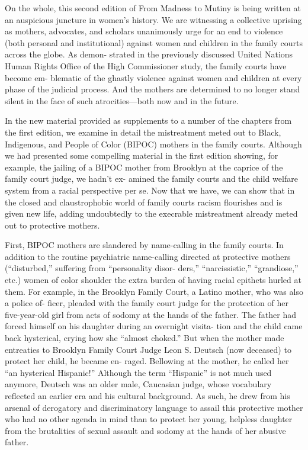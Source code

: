 On the whole, this second edition of From Madness to Mutiny is being
written at an auspicious juncture in women’s history. We are witnessing
a collective uprising as mothers, advocates, and scholars unanimously
urge for an end to violence (both personal and institutional) against
women and children in the family courts across the globe. As demon-
strated in the previously discussed United Nations Human Rights Office
of the High Commissioner study, the family courts have become em-
blematic of the ghastly violence against women and children at every
phase of the judicial process. And the mothers are determined to no
longer stand silent in the face of such atrocities—both now and in the
future. \pfl{}





In the new material provided as supplements to a number of the chapters
from the first edition, we examine in detail the mistreatment meted
out to Black, Indigenous, and People of Color (BIPOC) mothers in the
family courts. Although we had presented some compelling material in
the first edition showing, for example, the jailing of a BIPOC mother
from Brooklyn at the caprice of the family court judge, we hadn’t ex-
amined the family courts and the child welfare system from a racial
perspective per se. Now that we have, we can show that in the closed and
claustrophobic world of family courts racism flourishes and is given new
life, adding undoubtedly to the execrable mistreatment already meted
out to protective mothers. \pfl{}



First, BIPOC mothers are slandered by name-calling in the family
courts. In addition to the routine psychiatric name-calling directed
at protective mothers (“disturbed,” suffering from “personality disor-
ders,” “narcissistic,” “grandiose,” etc.) women of color shoulder the extra
burden of having racial epithets hurled at them. For example, in the
Brooklyn Family Court, a Latino mother, who was also a police of-
ficer, pleaded with the family court judge for the protection of her
five-year-old girl from acts of sodomy at the hands of the father. The
father had forced himself on his daughter during an overnight visita-
tion and the child came back hysterical, crying how she “almost choked.”
But when the mother made entreaties to Brooklyn Family Court Judge
Leon S. Deutsch (now deceased) to protect her child, he became en-
raged. Bellowing at the mother, he called her “an hysterical Hispanic!”
Although the term “Hispanic” is not much used anymore, Deutsch was
an older male, Caucasian judge, whose vocabulary reflected an earlier
era and his cultural background. As such, he drew from his arsenal of
derogatory and discriminatory language to assail this protective mother
who had no other agenda in mind than to protect her young, helpless
daughter from the brutalities of sexual assault and sodomy at the hands
of her abusive father. \pfl{}


